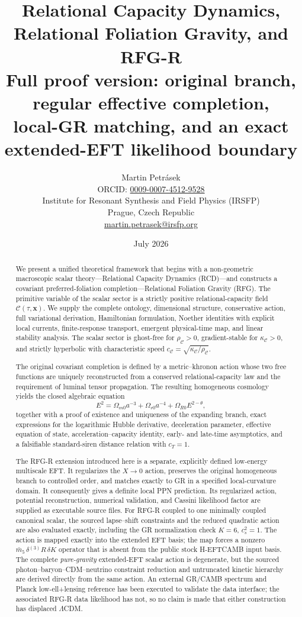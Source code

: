 \documentclass[11pt,a4paper]{article}
\title{\textbf{Relational Capacity Dynamics, Relational Foliation Gravity, and RFG-R}\\[0.4em]
\large Full proof version: original branch, regular effective completion,\\ local-GR matching, and an exact extended-EFT likelihood boundary}
\author{Martin Petr\'{a}sek\\[0.3em]
\small ORCID: \href{https://orcid.org/0009-0007-4512-9528}{0009-0007-4512-9528}\\[0.2em]
\small Institute for Resonant Synthesis and Field Physics (IRSFP)\\
\small Prague, Czech Republic\\
\small \href{mailto:martin.petrasek@irsfp.org}{martin.petrasek@irsfp.org}}
\date{July 2026}
\newcommand{\C}{\mathcal{C}}
\newcommand{\rhoC}{\rho_{\mathcal{C}}}
\newcommand{\kC}{\kappa_{\mathcal{C}}}
\begin{document}
\maketitle

\begin{abstract}
We present a unified theoretical framework that begins with a non-geometric macroscopic scalar theory---Relational Capacity Dynamics (RCD)---and constructs a covariant preferred-foliation completion---Relational Foliation Gravity (RFG). The primitive variable of the scalar sector is a strictly positive relational-capacity field \(\C(\tau,\mathbf{x})\). We supply the complete ontology, dimensional structure, conservative action, full variational derivation, Hamiltonian formulation, Noether identities with explicit local currents, finite-response transport, emergent physical-time map, and linear stability analysis. The scalar sector is ghost-free for \(\rhoC>0\), gradient-stable for \(\kC>0\), and strictly hyperbolic with characteristic speed \(c_{\mathcal{C}}=\sqrt{\kC/\rhoC}\).

The original covariant completion is defined by a metric--khronon action whose two free functions are uniquely reconstructed from a conserved relational-capacity law and the requirement of luminal tensor propagation. The resulting homogeneous cosmology yields the closed algebraic equation
\[
E^2=\Omega_{m0}a^{-3}+\Omega_{r0}a^{-4}+\Omega_{R0}E^{2-\theta},
\]
together with a proof of existence and uniqueness of the expanding branch, exact expressions for the logarithmic Hubble derivative, deceleration parameter, effective equation of state, acceleration--capacity identity, early- and late-time asymptotics, and a falsifiable standard-siren distance relation with \(c_T=1\).

The RFG-R extension introduced here is a separate, explicitly defined low-energy multiscale EFT. It regularizes the \(X\to0\) action, preserves the original homogeneous branch to controlled order, and matches exactly to GR in a specified local-curvature domain. It consequently gives a definite local PPN prediction. Its regularized action, potential reconstruction, numerical validation, and Cassini likelihood factor are supplied as executable source files. For RFG-R coupled to one minimally coupled canonical scalar, the sourced lapse--shift constraints and the reduced quadratic action are also evaluated exactly, including the GR normalization check \(K=6\), \(c_s^2=1\). The action is mapped exactly into the extended EFT basis; the map forces a nonzero \(\bar m_5\,\delta{}^{(3)}R\,\delta K\) operator that is absent from the public stock H-EFTCAMB input basis. The complete \emph{pure-gravity} extended-EFT scalar action is degenerate, but the sourced photon--baryon--CDM--neutrino constraint reduction and untruncated kinetic hierarchy are derived directly from the same action. An external GR/CAMB spectrum and Planck low-ell+lensing reference has been executed to validate the data interface; the associated RFG-R data likelihood has not, so no claim is made that either construction has displaced \(\Lambda\)CDM.
\end{abstract}
\end{document}
